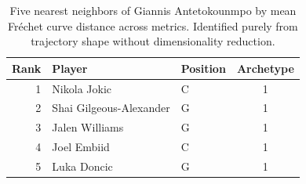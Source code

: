 \begin{table}[htbp]
  \centering\small
  \begin{tabular}{rllc}
    \toprule
    Rank & Player & Position & Archetype \\
    \midrule
    1 & Nikola Jokic & C & 1 \\
    2 & Shai Gilgeous-Alexander & G & 1 \\
    3 & Jalen Williams & G & 1 \\
    4 & Joel Embiid & C & 1 \\
    5 & Luka Doncic & G & 1 \\
    \bottomrule
  \end{tabular}
  \caption{Five nearest neighbors of Giannis Antetokounmpo by mean Fr\'{e}chet curve distance across metrics. Identified purely from trajectory shape without dimensionality reduction.}
  \label{tab:Giannis_Antetokounmpo_frechet_curve_neighbors}
\end{table}

